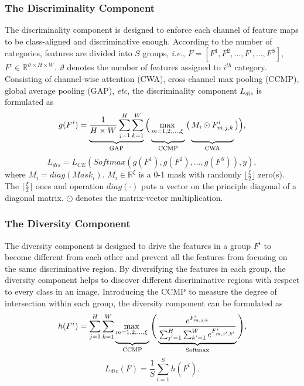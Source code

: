 \documentclass[journal]{IEEEtran}
\begin{document}
\subsubsection{The Discriminality Component}

The discriminality component is designed to enforce each channel of feature maps to be class-aligned and discriminative enough. According to the number of categories, features are divided into $S$ groups, \emph{i.e.}, $F = [F^1, F^2, ..., F^i, ...,F^S]$, $F^i \in \mathbb{R}^{\vartheta \times H \times W}$. $\vartheta$ denotes the number of features assigned to $i^{th}$ category. Consisting of channel-wise attention (CWA), cross-channel max pooling (CCMP), global average pooling (GAP), \emph{etc}, the discriminality component $L_{dis}$ is formulated as
\begin{equation}
g(F^i) = \underbrace{\frac{1}{H \times W} \sum_{j=1}^{H} \sum_{k=1}^{W}}_{\text{GAP}}
\Big(
\underbrace{\max_{m=1,2,...,\xi}\vphantom{\sum_{j=1}^{W}}}_{\text{CCMP}}
\big(
\underbrace{M_i \odot F_{m,j,k}^{i}\vphantom{\sum_{j=1}^{W}}}_{\text{CWA}}
\big)
\Big),
\end{equation}
\begin{equation}
L_{dis} = L_{CE}(Softmax(g(F^1), g(F^2), ..., g(F^S)), y),
\end{equation}
where $M_i = diag(Mask_i)$. $M_i \in \mathbb{R}^{\xi}$ is a 0-1 mask with randomly $\big\lfloor \frac{\xi}{2} \big\rfloor$ zero(s). The $\big\lceil \frac{\xi}{2} \big\rceil$ ones and operation $diag(\cdot)$ puts a vector on the principle diagonal of a diagonal matrix. $\odot$ denotes the matrix-vector multiplication.

\subsubsection{The Diversity Component}

The diversity component is designed to drive the features in a group $F^i$ to become different from each other and prevent all the features from focusing on the same discriminative region. By diversifying the features in each group, the diversity component helps to discover different discriminative regions with respect to every class in an image. Introducing the CCMP to measure the degree of intersection within each group, the diversity component can be formulated as
\begin{equation}
h(F^i) = \sum_{j=1}^{H} \sum_{k=1}^{W}
\underbrace{\max_{m=1,2,...,\xi}\vphantom{\sum_{j=1}^{W}}}_{\text{CCMP}}
\Bigg(
\underbrace{\frac{e^{F^i_{m,j,k}}}{\sum_{j^{\prime}=1}^{H} \sum_{k^{\prime}=1}^{W}e^{F_{m,j^{\prime},k^{\prime}}^i}}\vphantom{\sum_{j=1}^{W}}}_{\text{Softmax}}
\Bigg),
\end{equation}
\begin{equation}
L_{div}(F) = \frac{1}{S} \sum_{i=1}^{S} h(F^i).
\end{equation}
\end{document}
